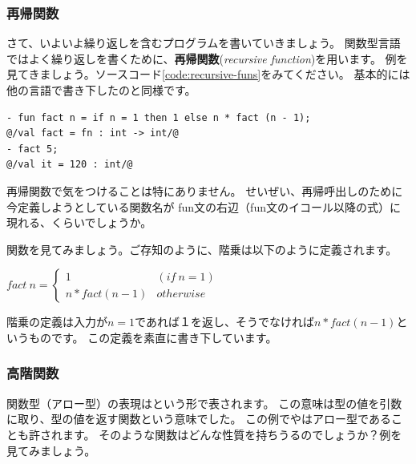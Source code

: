 \documentclass[11pt,a4paper]{jarticle}
\begin{document}
\subsubsection{再帰関数}

さて、いよいよ繰り返しを含むプログラムを書いていきましょう。
関数型言語ではよく繰り返しを書くために、{\bfseries 再帰関数}({\itshape recursive function})を用います。
例を見てきましょう。ソースコード\ref{code:recursive-funs}をみてください。
基本的には他の言語で書き下したのと同様です。

\begin{lstlisting}[caption=再帰関数,label=code:recursive-funs]
- fun fact n = if n = 1 then 1 else n * fact (n - 1);
@/val fact = fn : int -> int/@
- fact 5;
@/val it = 120 : int/@
\end{lstlisting}

再帰関数で気をつけることは特にありません。
せいぜい、再帰呼出しのために今定義しようとしている関数名が
fun文の右辺（fun文のイコール以降の式）に現れる、くらいでしょうか。

関数を見てみましょう。ご存知のように、階乗は以下のように定義されます。

$fact \ n = \begin{cases} 1 & (if \ n = 1) \\ n * fact (n - 1) & otherwise \end{cases}$

階乗の定義は入力が$n=1$であれば１を返し、そうでなければ$n * fact (n - 1)$というものです。
この定義を素直に書き下しています。



\subsubsection{高階関数}
関数型（アロー型）の表現はという形で表されます。
この意味は型の値を引数に取り、型の値を返す関数という意味でした。
この例でやはアロー型であることも許されます。
そのような関数はどんな性質を持ちうるのでしょうか？例を見てみましょう。
\end{document}
